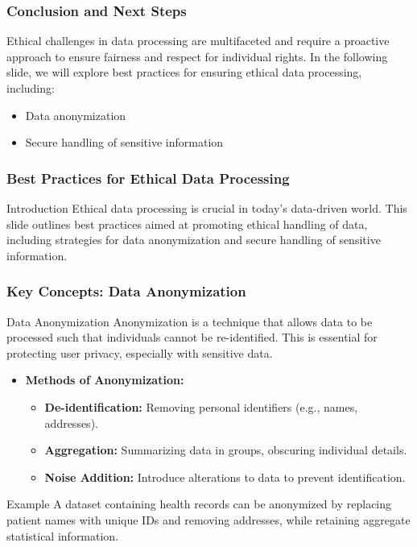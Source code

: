 \documentclass[aspectratio=169]{beamer}
\begin{document}
\begin{frame}[fragile]
    \frametitle{Conclusion and Next Steps}
    Ethical challenges in data processing are multifaceted and require a proactive approach to ensure fairness 
    and respect for individual rights. 
    In the following slide, we will explore best practices for ensuring ethical data processing, including:
    \begin{itemize}
        \item Data anonymization
        \item Secure handling of sensitive information
    \end{itemize}
\end{frame}

\begin{frame}[fragile]
    \frametitle{Best Practices for Ethical Data Processing}
    \begin{block}{Introduction}
        Ethical data processing is crucial in today's data-driven world. This slide outlines best practices aimed at promoting ethical handling of data, including strategies for data anonymization and secure handling of sensitive information.
    \end{block}
\end{frame}

\begin{frame}[fragile]
    \frametitle{Key Concepts: Data Anonymization}
    \begin{block}{Data Anonymization}
        Anonymization is a technique that allows data to be processed such that individuals cannot be re-identified. This is essential for protecting user privacy, especially with sensitive data.
    \end{block}
    \begin{itemize}
        \item \textbf{Methods of Anonymization:}
        \begin{itemize}
            \item \textbf{De-identification:} Removing personal identifiers (e.g., names, addresses).
            \item \textbf{Aggregation:} Summarizing data in groups, obscuring individual details.
            \item \textbf{Noise Addition:} Introduce alterations to data to prevent identification.
        \end{itemize}
    \end{itemize}
    \begin{block}{Example}
        A dataset containing health records can be anonymized by replacing patient names with unique IDs and removing addresses, while retaining aggregate statistical information.
    \end{block}
\end{frame}
\end{document}
